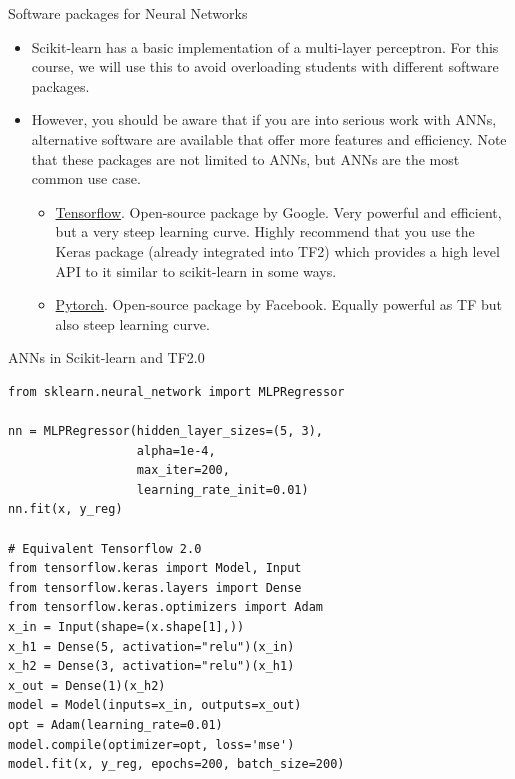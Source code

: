 \documentclass[aspectratio=169]{beamer}
\begin{document}
\begin{frame}{Software packages for Neural Networks}
    \begin{itemize}
        \item Scikit-learn has a basic implementation of a multi-layer perceptron. For this course, we will use this to avoid overloading students with different software packages.
        \item However, you should be aware that if you are into serious work with ANNs, alternative software are available that offer more features and efficiency. Note that these packages are not limited to ANNs, but ANNs are the most common use case.
        \begin{itemize}
            \item \href{https://www.tensorflow.org/}{Tensorflow}. Open-source package by Google. Very powerful and efficient, but a very steep learning curve. Highly recommend that you use the Keras package (already integrated into TF2) which provides a high level API to it similar to scikit-learn in some ways.
            \item \href{https://pytorch.org/}{Pytorch}. Open-source package by Facebook. Equally powerful as TF but also steep learning curve.
        \end{itemize}
    \end{itemize}
\end{frame}


\begin{frame}[fragile]{ANNs in Scikit-learn and TF2.0}
\begin{verbatim}
from sklearn.neural_network import MLPRegressor

nn = MLPRegressor(hidden_layer_sizes=(5, 3),
                  alpha=1e-4,
                  max_iter=200,
                  learning_rate_init=0.01)
nn.fit(x, y_reg)

# Equivalent Tensorflow 2.0
from tensorflow.keras import Model, Input
from tensorflow.keras.layers import Dense
from tensorflow.keras.optimizers import Adam
x_in = Input(shape=(x.shape[1],))
x_h1 = Dense(5, activation="relu")(x_in)
x_h2 = Dense(3, activation="relu")(x_h1)
x_out = Dense(1)(x_h2)
model = Model(inputs=x_in, outputs=x_out)
opt = Adam(learning_rate=0.01)
model.compile(optimizer=opt, loss='mse')
model.fit(x, y_reg, epochs=200, batch_size=200)
\end{verbatim}
\end{frame}
\end{document}
